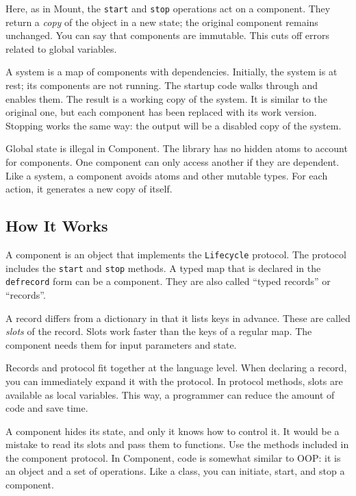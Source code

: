 Here, as in Mount, the \verb|start| and \verb|stop| operations act on a component. They return a \emph{copy} of the object in a new state; the original component remains unchanged. You can say that components are immutable. This cuts off errors related to global variables.

A system is a map of components with dependencies. Initially, the system is at rest; its components are not running. The startup code walks through and enables them. The result is a working copy of the system. It is similar to the original one, but each component has been replaced with its work version. Stopping works the same way: the output will be a disabled copy of the system.

Global state is illegal in Component. The library has no hidden atoms to account for components. One component can only access another if they are dependent. Like a system, a component avoids atoms and other mutable types. For each action, it generates a new copy of itself.

\subsection{How It Works}

\label{defrecord}

A component is an object that implements the \verb|Lifecycle| protocol. The protocol includes the \verb|start| and \verb|stop| methods. A typed map that is declared in the \verb|defrecord| form can be a component. They are also called “typed records” or “records”.


A record differs from a dictionary in that it lists keys in advance. These are called \emph{slots} of the record. Slots work faster than the keys of a regular map. The component needs them for input parameters and state.

Records and protocol fit together at the language level. When declaring a record, you can immediately expand it with the protocol. In protocol methods, slots are available as local variables. This way, a programmer can reduce the amount of code and save time.


A component hides its state, and only it knows how to control it. It would be a mistake to read its slots and pass them to functions. Use the methods included in the component protocol. In Component, code is somewhat similar to OOP: it is an object and a set of operations. Like a class, you can initiate, start, and stop a component.


